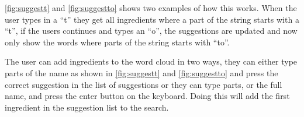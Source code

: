 \autoref{fig:suggestt} and \autoref{fig:suggestto} shows two examples of how this works. When the user types in a ``t'' they get all ingredients where a part of the string starts with a ``t'', if the users continues and types an ``o'', the suggestions are updated and now only show the words where parts of the string starts with ``to''. 

The user can add ingredients to the word cloud in two ways, they can either type parts of the name as shown in \autoref{fig:suggestt} and \autoref{fig:suggestto} and press the correct suggestion in the list of suggestions or they can type parts, or the full name, and press the enter button on the keyboard. Doing this will add the first ingredient in the suggestion list to the search.